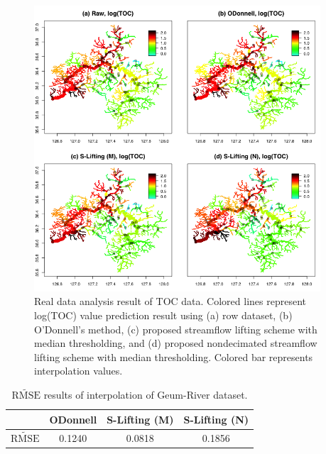 \documentclass[11pt,titlepage]{article}
\begin{document}
\begin{figure}
	\centering\includegraphics[width=0.95\textwidth]{Stream_result/result_TOC3.png}
	\vspace{-3mm}
	\caption{Real data analysis result of TOC data. Colored lines represent log(TOC) value prediction result using (a) row dataset, (b) O'Donnell's method, (c) proposed streamflow lifting scheme with median thresholding, and (d) proposed nondecimated streamflow lifting scheme with median thresholding. Colored bar represents interpolation values.%
	}
	\label{fig:realanalysis}
\end{figure}


\begin{table}[]
	\centering
	\begin{tabular}{|c|c|c|c|}
		\hline
		& ODonnell & S-Lifting (M) & S-Lifting (N) \\ \hline
		$\widetilde{\text{RMSE}}$ & 0.1240   & 0.0818        & 0.1856        \\ \hline
	\end{tabular}
	\caption{$\widetilde{\text{RMSE}}$ results of interpolation of Geum-River dataset.}
	\label{table:realanalysis}
\end{table}
\end{document}
